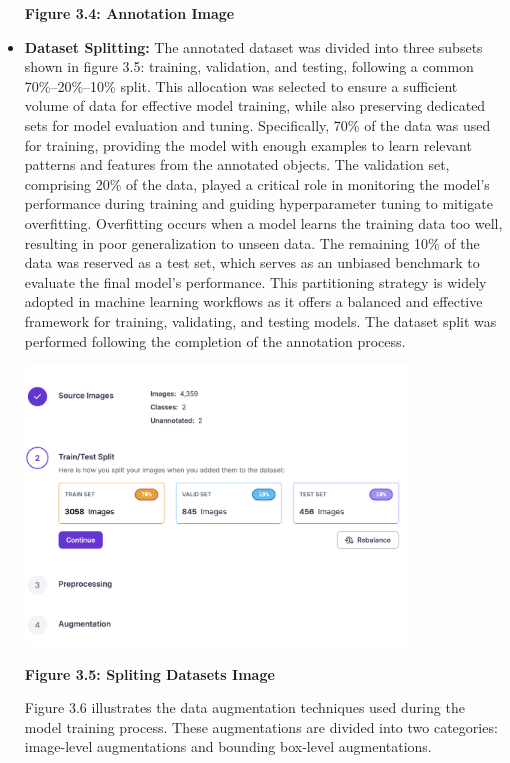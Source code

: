 \begin{itemize}
\begin{center}
		\vspace{0.5em}
		\textbf{Figure 3.4: Annotation Image}
	\end{center}
	\newpage
	\item \textbf{Dataset Splitting:}  The annotated dataset was divided into three subsets shown in figure 3.5: training, validation, and testing, following a common 70\%–20\%–10\% split. This allocation was selected to ensure a sufficient volume of data for effective model training, while also preserving dedicated sets for model evaluation and tuning. Specifically, 70\% of the data was used for training, providing the model with enough examples to learn relevant patterns and features from the annotated objects. The validation set, comprising 20\% of the data, played a critical role in monitoring the model's performance during training and guiding hyperparameter tuning to mitigate overfitting. Overfitting occurs when a model learns the training data too well, resulting in poor generalization to unseen data. The remaining 10\% of the data was reserved as a test set, which serves as an unbiased benchmark to evaluate the final model's performance. This partitioning strategy is widely adopted in machine learning workflows as it offers a balanced and effective framework for training, validating, and testing models. The dataset split was performed following the completion of the annotation process.
	\begin{center}
		\includegraphics[width=0.8\textwidth]{Split.png}
		
		\vspace{0.5em}
		\textbf{Figure 3.5: Spliting Datasets Image}
	\end{center}
	\noindent\hspace{2.5em}Figure 3.6 illustrates the data augmentation techniques used during the model training process. These augmentations are divided into two categories: image-level augmentations and bounding box-level augmentations.
	

\end{itemize}
